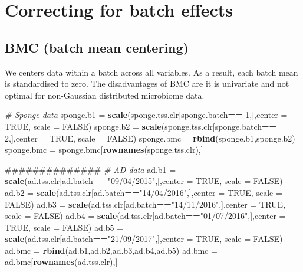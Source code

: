 \documentclass[]{book}
\newenvironment{Shaded}{\begin{snugshade}}{\end{snugshade}}
\newcommand{\KeywordTok}[1]{\textcolor[rgb]{0.13,0.29,0.53}{\textbf{#1}}}
\newcommand{\DataTypeTok}[1]{\textcolor[rgb]{0.13,0.29,0.53}{#1}}
\newcommand{\DecValTok}[1]{\textcolor[rgb]{0.00,0.00,0.81}{#1}}
\newcommand{\StringTok}[1]{\textcolor[rgb]{0.31,0.60,0.02}{#1}}
\newcommand{\CommentTok}[1]{\textcolor[rgb]{0.56,0.35,0.01}{\textit{#1}}}
\newcommand{\OtherTok}[1]{\textcolor[rgb]{0.56,0.35,0.01}{#1}}
\newcommand{\OperatorTok}[1]{\textcolor[rgb]{0.81,0.36,0.00}{\textbf{#1}}}
\newcommand{\NormalTok}[1]{#1}
\begin{document}
\section{Correcting for batch
effects}\label{correcting-for-batch-effects}

\subsection{BMC (batch mean centering)}\label{bmc-batch-mean-centering}

We centers data within a batch across all variables. As a result, each
batch mean is standardised to zero. The disadvantages of BMC are it is
univariate and not optimal for non-Gaussian distributed microbiome data.

\begin{Shaded}
\begin{Highlighting}[]
\CommentTok{# Sponge data}
\NormalTok{sponge.b1 =}\StringTok{ }\KeywordTok{scale}\NormalTok{(sponge.tss.clr[sponge.batch}\OperatorTok{==}\StringTok{ }\DecValTok{1}\NormalTok{,],}\DataTypeTok{center =} \OtherTok{TRUE}\NormalTok{, }\DataTypeTok{scale =} \OtherTok{FALSE}\NormalTok{)}
\NormalTok{sponge.b2 =}\StringTok{ }\KeywordTok{scale}\NormalTok{(sponge.tss.clr[sponge.batch}\OperatorTok{==}\StringTok{ }\DecValTok{2}\NormalTok{,],}\DataTypeTok{center =} \OtherTok{TRUE}\NormalTok{, }\DataTypeTok{scale =} \OtherTok{FALSE}\NormalTok{)}
\NormalTok{sponge.bmc =}\StringTok{ }\KeywordTok{rbind}\NormalTok{(sponge.b1,sponge.b2)}
\NormalTok{sponge.bmc =}\StringTok{ }\NormalTok{sponge.bmc[}\KeywordTok{rownames}\NormalTok{(sponge.tss.clr),]}

\NormalTok{##############}
\CommentTok{# AD data}
\NormalTok{ad.b1 =}\StringTok{ }\KeywordTok{scale}\NormalTok{(ad.tss.clr[ad.batch}\OperatorTok{==}\StringTok{"09/04/2015"}\NormalTok{,],}\DataTypeTok{center =} \OtherTok{TRUE}\NormalTok{, }\DataTypeTok{scale =} \OtherTok{FALSE}\NormalTok{)}
\NormalTok{ad.b2 =}\StringTok{ }\KeywordTok{scale}\NormalTok{(ad.tss.clr[ad.batch}\OperatorTok{==}\StringTok{"14/04/2016"}\NormalTok{,],}\DataTypeTok{center =} \OtherTok{TRUE}\NormalTok{, }\DataTypeTok{scale =} \OtherTok{FALSE}\NormalTok{)}
\NormalTok{ad.b3 =}\StringTok{ }\KeywordTok{scale}\NormalTok{(ad.tss.clr[ad.batch}\OperatorTok{==}\StringTok{"14/11/2016"}\NormalTok{,],}\DataTypeTok{center =} \OtherTok{TRUE}\NormalTok{, }\DataTypeTok{scale =} \OtherTok{FALSE}\NormalTok{)}
\NormalTok{ad.b4 =}\StringTok{ }\KeywordTok{scale}\NormalTok{(ad.tss.clr[ad.batch}\OperatorTok{==}\StringTok{"01/07/2016"}\NormalTok{,],}\DataTypeTok{center =} \OtherTok{TRUE}\NormalTok{, }\DataTypeTok{scale =} \OtherTok{FALSE}\NormalTok{)}
\NormalTok{ad.b5 =}\StringTok{ }\KeywordTok{scale}\NormalTok{(ad.tss.clr[ad.batch}\OperatorTok{==}\StringTok{"21/09/2017"}\NormalTok{,],}\DataTypeTok{center =} \OtherTok{TRUE}\NormalTok{, }\DataTypeTok{scale =} \OtherTok{FALSE}\NormalTok{)}
\NormalTok{ad.bmc =}\StringTok{ }\KeywordTok{rbind}\NormalTok{(ad.b1,ad.b2,ad.b3,ad.b4,ad.b5)}
\NormalTok{ad.bmc =}\StringTok{ }\NormalTok{ad.bmc[}\KeywordTok{rownames}\NormalTok{(ad.tss.clr),]}
\end{Highlighting}
\end{Shaded}
\end{document}
